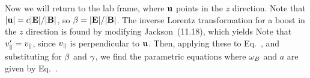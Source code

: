 {	Now we will return to the lab frame, where $\vb{u}$ points in the $z$ direction.  Note that $\abs{\vb{u}} = c \abs{\vb{E}} / \abs{\vb{B}}$, so $\beta = \abs{\vb{E}} / \abs{\vb{B}}$.  The inverse Lorentz transformation for a boost in the $z$ direction is found by modifying Jackson~(11.18), which yields
	Note that $v_\parallel' = v_\parallel$, since $v_\parallel$ is perpendicular to $\vb{u}$.  Then, applying these to Eq.~, and substituting for $\beta$ and $\gamma$, we find the parametric equations
	{\color{blue} }%
	where $\omega_B$ and $a$ are given by Eq.~.
}

%
%


